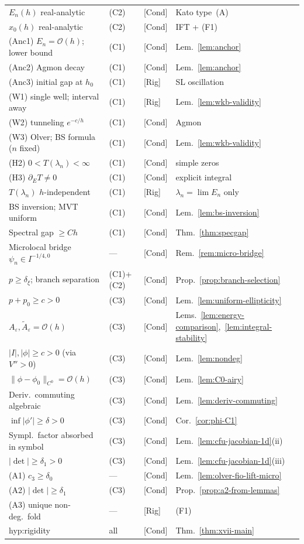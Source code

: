\documentclass[12pt,a4paper]{amsart}
\theoremstyle{definition}
\theoremstyle{remark}
\newcommand{\Rig}{\textup{[Rig]}}
\newcommand{\Cond}{\textup{[Cond]}}
\begin{document}
\begin{center}
\begin{tabular}{lllp{3.5cm}}
$E_n(h)$ real-analytic & (C2) & \Cond & Kato type~(A) \\
$x_0(h)$ real-analytic & (C2) & \Cond & IFT + (F1) \\
(Anc1) $E_n=\mathcal{O}(h)$; lower bound & (C1) & \Cond & Lem.~\ref{lem:anchor} \\
(Anc2) Agmon decay & (C1) & \Cond & Lem.~\ref{lem:anchor} \\
(Anc3) initial gap at $h_0$ & (C1) & \Rig & SL oscillation \\
(W1) single well; interval away & (C1) & \Rig & Lem.~\ref{lem:wkb-validity} \\
(W2) tunneling $e^{-c/h}$ & (C1) & \Cond & Agmon \\
(W3) Olver; BS formula ($n$ fixed) & (C1) & \Cond & Lem.~\ref{lem:wkb-validity} \\
(H2) $0<T(\lambda_n)<\infty$ & (C1) & \Cond & simple zeros \\
(H3) $\partial_E T\ne 0$ & (C1) & \Cond & explicit integral \\
$T(\lambda_n)$ $h$-independent & (C1) & \Rig & $\lambda_n=\lim E_n$ only \\
BS inversion; MVT uniform & (C1) & \Cond & Lem.~\ref{lem:bs-inversion} \\
Spectral gap $\ge Ch$ & (C1) & \Cond & Thm.~\ref{thm:specgap} \\
Microlocal bridge $\psi_n\in I^{-1/4,0}$ & --- & \Cond & Rem.~\ref{rem:micro-bridge} \\
$p\ge\delta_\xi$; branch separation & (C1)+(C2) & \Cond & Prop.~\ref{prop:branch-selection} \\
$p+p_0\ge c>0$ & (C3) & \Cond & Lem.~\ref{lem:uniform-ellipticity} \\
$A_\varepsilon,\tilde A_\varepsilon=\mathcal{O}(h)$ & (C3) & \Cond & Lems.~\ref{lem:energy-comparison},~\ref{lem:integral-stability} \\
$|I|,|\phi|\ge c>0$ (via $V''>0$) & (C3) & \Cond & Lem.~\ref{lem:nondeg} \\
$\|\phi-\phi_0\|_{C^0}=\mathcal{O}(h)$ & (C3) & \Cond & Lem.~\ref{lem:C0-airy} \\
Deriv.\ commuting algebraic & (C3) & \Cond & Lem.~\ref{lem:deriv-commuting} \\
$\inf|\phi'|\ge\delta>0$ & (C3) & \Cond & Cor.~\ref{cor:phi-C1} \\
Sympl.\ factor absorbed in symbol & (C3) & \Cond & Lem.~\ref{lem:cfu-jacobian-1d}(ii) \\
$|\det|\ge\delta_1>0$ & (C3) & \Cond & Lem.~\ref{lem:cfu-jacobian-1d}(iii) \\
(A1) $c_3\ge\delta_0$ & --- & \Cond & Lem.~\ref{lem:olver-fio-lift-micro} \\
(A2) $|\det|\ge\delta_1$ & (C3) & \Cond & Prop.~\ref{prop:a2-from-lemmas} \\
(A3) unique non-deg.\ fold & --- & \Rig & (F1) \\
\textup{hyp:rigidity} & all & \Cond & Thm.~\ref{thm:xvii-main} \\
\hline
\end{tabular}
\end{center}
\end{document}
